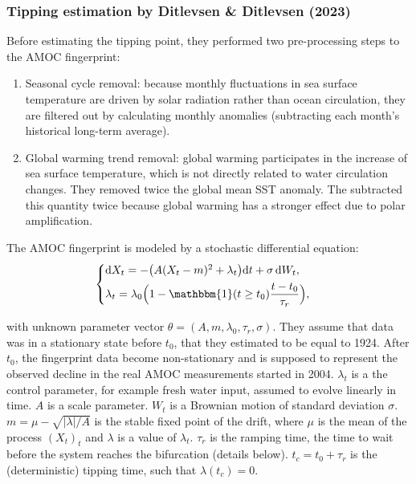 \documentclass[12pt,a4paper]{article}
\theoremstyle{definition}
\theoremstyle{plain}
\newcommand{\dd}{\mathrm{d}}
\newcommand{\ind}{\mathbbm{1}}
\begin{document}
\subsubsection{Tipping estimation by Ditlevsen \& Ditlevsen (2023) \cite{ditlevsen2023}}


Before estimating the tipping point, they performed two pre-processing steps to the AMOC fingerprint:
\begin{enumerate}
    \item Seasonal cycle removal: because monthly fluctuations in sea surface temperature are driven by solar radiation rather than ocean circulation, they are filtered out by calculating monthly anomalies (subtracting each month's historical long-term average). 
    \item Global warming trend removal: global warming participates in the increase of sea surface temperature, which is not directly related to water circulation changes. They removed twice the global mean SST anomaly. The subtracted this quantity twice because global warming has a stronger effect due to polar amplification. \\
\end{enumerate}

\noindent The AMOC fingerprint is modeled by a stochastic differential equation:
\begin{equation}
\label{eq:model}
\begin{cases}
\dd X_t=-\big(A(X_t-m)^2+\lambda_t\big)\dd t+\sigma\,\dd W_t, \\[4pt]
\lambda_t=\lambda_0\Big(1-\ind(t\ge t_0)\dfrac{t-t_0}{\tau_r}\Big),
\end{cases}
\end{equation}

\noindent with unknown parameter vector $\theta=(A,m,\lambda_0,\tau_r,\sigma)$. They assume that  data was in a stationary state before $t_0$, that they estimated to be equal to 1924. After $t_0$, the fingerprint data become non-stationary and is supposed to represent the observed decline in the real AMOC measurements started in 2004. $\lambda_t$ is a the control parameter, for example fresh water input, assumed to evolve linearly in time. $A$ is a scale parameter. $W_t$ is a Brownian motion of standard deviation $\sigma$. $m = \mu - \sqrt{|\lambda|/A}$ is the stable fixed point of the drift, where $\mu$ is the mean of the process $(X_t)_t$ and $\lambda$ is a value of $\lambda_t$. $\tau_r$ is the ramping time, the time to wait before the system reaches the bifurcation (details below). $t_c = t_0 + \tau_r$ is the (deterministic) tipping time, such that $\lambda(t_c) = 0$. \\
\end{document}
